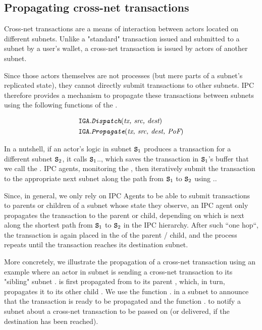 \subsection{Propagating cross-net transactions}
\label{sec:cross-net-tx}

Cross-net transactions are a means of interaction between actors located on different subnets.
Unlike a "standard" transaction issued and submitted to a subnet by a user's wallet,
a cross-net transaction is issued by actors of another subnet.

Since those actors themselves are not processes (but mere parts of a subnet's replicated state),
they cannot directly submit transactions to other subnets.
IPC therefore provides a mechanism to propagate these transactions between subnets using the following functions of the \gw.

\begin{align*}
    \texttt{IGA}.&\textit{\texttt{Dispatch}}(\textit{tx, src, dest})\\
    \texttt{IGA}.&\textit{\texttt{Propagate}}(\textit{tx, src, dest, \textit{PoF}})
\end{align*}

In a nutshell, if an actor's logic in subnet $\textbf{\texttt{S}}_1$ produces a transaction for a different subnet $\textbf{\texttt{S}}_2$,
it calls $\textbf{\texttt{S}}_1$.\gw., which saves the transaction in $\textbf{\texttt{S}}_1$'s \gw buffer that we call the \postoffice.
IPC agents, monitoring the \postoffice, then iteratively submit the transaction to the appropriate next subnet along the path from $\textbf{\texttt{S}}_1$ to $\textbf{\texttt{S}}_2$ using \gw..

Since, in general, we only rely on IPC Agents to be able to submit transactions to parents or children of a subnet whose state they observe,
an IPC agent only propagates the transaction to the parent or child, depending on which is next along the shortest path from $\textbf{\texttt{S}}_1$ to $\textbf{\texttt{S}}_2$ in the IPC hierarchy.
After such ``one hop``, the transaction is again placed in the \postoffice of the parent / child, and the process repeats until the transaction reaches its destination subnet.

More concretely, we illustrate the propagation of a cross-net transaction using an example where an actor in subnet 
is sending a cross-net transaction  to its "sibling" subnet .
 is first propagated from  to its parent , which, in turn, propagates it to its other child .
We use the function \gw. in a subnet to announce that the transaction is ready to be propagated
and the function \gw. to notify a subnet about a cross-net transaction to be passed on (or delivered, if the destination has been reached).

